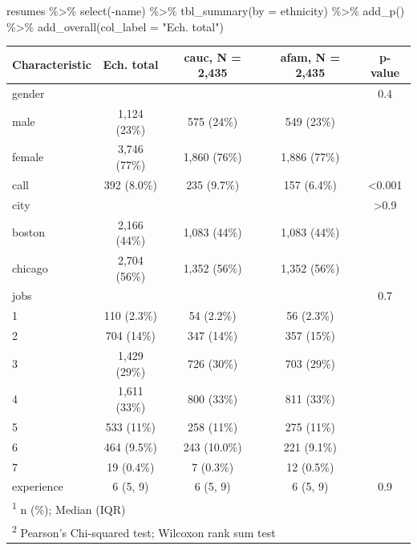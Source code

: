 \documentclass[
  11pt,
]{book}
\newenvironment{Shaded}{\begin{snugshade}}{\end{snugshade}}
\newcommand{\AttributeTok}[1]{\textcolor[rgb]{0.77,0.63,0.00}{#1}}
\newcommand{\FunctionTok}[1]{\textcolor[rgb]{0.00,0.00,0.00}{#1}}
\newcommand{\NormalTok}[1]{#1}
\newcommand{\SpecialCharTok}[1]{\textcolor[rgb]{0.00,0.00,0.00}{#1}}
\newcommand{\StringTok}[1]{\textcolor[rgb]{0.31,0.60,0.02}{#1}}
\numberwithin{equation}{section}
\numberwithin{countremarque}{section}
\begin{document}
\begin{Shaded}
\begin{Highlighting}[]
\NormalTok{resumes }\SpecialCharTok{\%\textgreater{}\%}
  \FunctionTok{select}\NormalTok{(}\SpecialCharTok{{-}}\NormalTok{name) }\SpecialCharTok{\%\textgreater{}\%} 
  \FunctionTok{tbl\_summary}\NormalTok{(}\AttributeTok{by =}\NormalTok{ ethnicity) }\SpecialCharTok{\%\textgreater{}\%} 
  \FunctionTok{add\_p}\NormalTok{() }\SpecialCharTok{\%\textgreater{}\%} 
  \FunctionTok{add\_overall}\NormalTok{(}\AttributeTok{col\_label =} \StringTok{"Ech. total"}\NormalTok{)}
\end{Highlighting}
\end{Shaded}

\begin{longtable}{lcccc}
\toprule
\textbf{Characteristic} & Ech. total & \textbf{cauc}, N = 2,435 & \textbf{afam}, N = 2,435 & \textbf{p-value}\\
\midrule
gender &  &  &  & 0.4\\
\hspace{1em}male & 1,124 (23\%) & 575 (24\%) & 549 (23\%) & \\
\hspace{1em}female & 3,746 (77\%) & 1,860 (76\%) & 1,886 (77\%) & \\
call & 392 (8.0\%) & 235 (9.7\%) & 157 (6.4\%) & <0.001\\
city &  &  &  & >0.9\\
\addlinespace
\hspace{1em}boston & 2,166 (44\%) & 1,083 (44\%) & 1,083 (44\%) & \\
\hspace{1em}chicago & 2,704 (56\%) & 1,352 (56\%) & 1,352 (56\%) & \\
jobs &  &  &  & 0.7\\
\hspace{1em}1 & 110 (2.3\%) & 54 (2.2\%) & 56 (2.3\%) & \\
\hspace{1em}2 & 704 (14\%) & 347 (14\%) & 357 (15\%) & \\
\addlinespace
\hspace{1em}3 & 1,429 (29\%) & 726 (30\%) & 703 (29\%) & \\
\hspace{1em}4 & 1,611 (33\%) & 800 (33\%) & 811 (33\%) & \\
\hspace{1em}5 & 533 (11\%) & 258 (11\%) & 275 (11\%) & \\
\hspace{1em}6 & 464 (9.5\%) & 243 (10.0\%) & 221 (9.1\%) & \\
\hspace{1em}7 & 19 (0.4\%) & 7 (0.3\%) & 12 (0.5\%) & \\
\addlinespace
experience & 6 (5, 9) & 6 (5, 9) & 6 (5, 9) & 0.9\\
\bottomrule
\multicolumn{5}{l}{\rule{0pt}{1em}\textsuperscript{1} n (\%); Median (IQR)}\\
\multicolumn{5}{l}{\rule{0pt}{1em}\textsuperscript{2} Pearson's Chi-squared test; Wilcoxon rank sum test}\\
\end{longtable}
\end{document}
